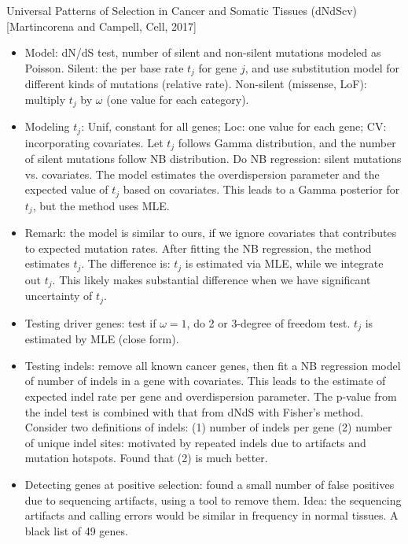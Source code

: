 \documentclass{report}
\begin{document}
Universal Patterns of Selection in Cancer and Somatic Tissues (dNdScv) [Martincorena and Campell, Cell, 2017]
\begin{itemize}
	
	\item Model: dN/dS test, number of silent and non-silent mutations modeled as Poisson. Silent: the per base rate $t_j$ for gene $j$, and use substitution model for different kinds of mutations (relative rate). Non-silent (missense, LoF): multiply $t_j$ by $\omega$ (one value for each category). 
	
	\item Modeling $t_j$: Unif, constant for all genes; Loc: one value for each gene; CV: incorporating covariates. Let $t_j$ follows Gamma distribution, and the number of silent mutations follow NB distribution. Do NB regression: silent mutations vs. covariates. The model estimates the overdispersion parameter and the expected value of $t_j$ based on covariates. This leads to a Gamma posterior for $t_j$, but the method uses MLE.  
	
	\item Remark: the model is similar to ours, if we ignore covariates that contributes to expected mutation rates. After fitting the NB regression, the method estimates $t_j$. The difference is: $t_j$ is estimated via MLE, while we integrate out $t_j$. This likely makes substantial difference when we have significant uncertainty of $t_j$. 
	
	\item Testing driver genes: test if $\omega = 1$, do 2 or 3-degree of freedom test. $t_j$ is estimated by MLE (close form). 
	
	\item Testing indels: remove all known cancer genes, then fit a NB regression model of number of indels in a gene with covariates. This leads to the estimate of expected indel rate per gene and overdispersion parameter. The p-value from the indel test is combined with that from dNdS with Fisher’s method. Consider two definitions of indels: (1) number of indels per gene (2) number of unique indel sites: motivated by repeated indels due to artifacts and mutation hotspots. Found that (2) is much better. 
	
	\item Detecting genes at positive selection: found a small number of false positives due to sequencing artifacts, using a tool to remove them. Idea: the sequencing artifacts and calling errors would be similar in frequency in normal tissues. A black list of 49 genes. 
	

\end{itemize}
\end{document}
